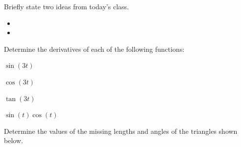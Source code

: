 \postClass

\begin{problem}
\item Briefly state two ideas from today's class.
  \begin{itemize}
  \item
  \item
  \end{itemize}
\item
  \begin{subproblem}
    \item
  \end{subproblem}
\end{problem}


\begin{problem}
\item Determine the derivatives of each of the following functions:
  \begin{subproblem}
  \item $\sin(3t)$
    \vfill
  \item $\cos(3t)$
    \vfill
  \item $\tan(3t)$
    \vfill
  \item $\sin(t)\cos(t)$
    \vfill
  \end{subproblem}

  \clearpage

\item Determine the values of the missing lengths and angles of the
  triangles shown below.

  \scalebox{0.5}{}

  \vfill

\end{problem}

